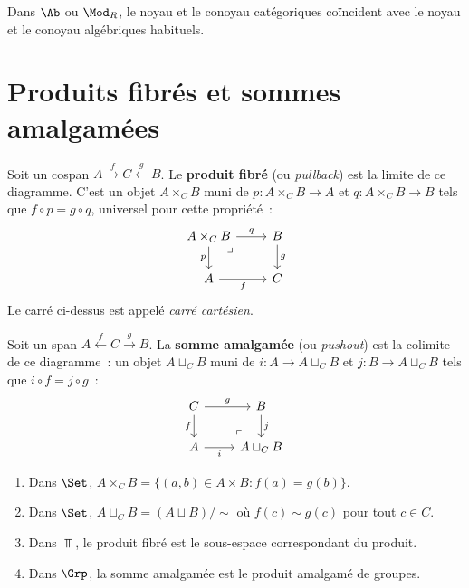 \begin{exemple}\label{ex:noyaux-concrets}
Dans $\Ab$ ou $\Mod_R$, le noyau et le conoyau catégoriques coïncident
avec le noyau et le conoyau algébriques habituels.
\end{exemple}


\section{Produits fibrés et sommes amalgamées}\label{sec:pullbacks-pushouts}

\begin{definition}\label{def:produit-fibre}
Soit un cospan $A \xrightarrow{f} C \xleftarrow{g} B$.
Le \textbf{produit fibré} (ou \emph{pullback}) est la limite de ce diagramme.
C'est un objet $A\times_C B$ muni de $p\colon A\times_C B\to A$ et
$q\colon A\times_C B\to B$ tels que $f\circ p = g\circ q$,
universel pour cette propriété~:
\[
\begin{tikzcd}
A\times_C B \arrow[r, "q"] \arrow[d, "p"'] \arrow[dr, phantom, "\lrcorner", very near start]
    & B \arrow[d, "g"] \\
A \arrow[r, "f"'] & C
\end{tikzcd}
\]
Le carré ci-dessus est appelé \emph{carré cartésien}.
\end{definition}

\begin{definition}\label{def:somme-amalgamee}
Soit un span $A \xleftarrow{f} C \xrightarrow{g} B$.
La \textbf{somme amalgamée} (ou \emph{pushout}) est la colimite de ce diagramme~:
un objet $A\sqcup_C B$ muni de $i\colon A\to A\sqcup_C B$ et
$j\colon B\to A\sqcup_C B$ tels que $i\circ f = j\circ g$~:
\[
\begin{tikzcd}
C \arrow[r, "g"] \arrow[d, "f"'] & B \arrow[d, "j"] \\
A \arrow[r, "i"'] & A\sqcup_C B \arrow[ul, phantom, "\ulcorner", very near start]
\end{tikzcd}
\]
\end{definition}

\begin{exemple}\label{ex:pullback-concrets}
\begin{enumerate}[label=(\roman*)]
\item Dans $\Set$, $A\times_C B = \{(a,b)\in A\times B : f(a)=g(b)\}$.
\item Dans $\Set$, $A\sqcup_C B = (A\sqcup B)/{\sim}$ où $f(c)\sim g(c)$
      pour tout $c\in C$.
\item Dans $\Top$, le produit fibré est le sous-espace correspondant du produit.
\item Dans $\Grp$, la somme amalgamée est le produit amalgamé de groupes.
\end{enumerate}
\end{exemple}

